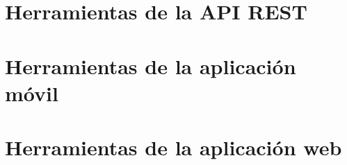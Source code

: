 
\appendix
\clearpage
\addappheadtotoc
\appendixpage


\chapter{Herramientas de la API REST\label{anexo:api-rest}}



\chapter{Herramientas de la aplicación móvil \label{anexo:app-android}}


\chapter{Herramientas de la aplicación web\label{anexo:app-web}}


